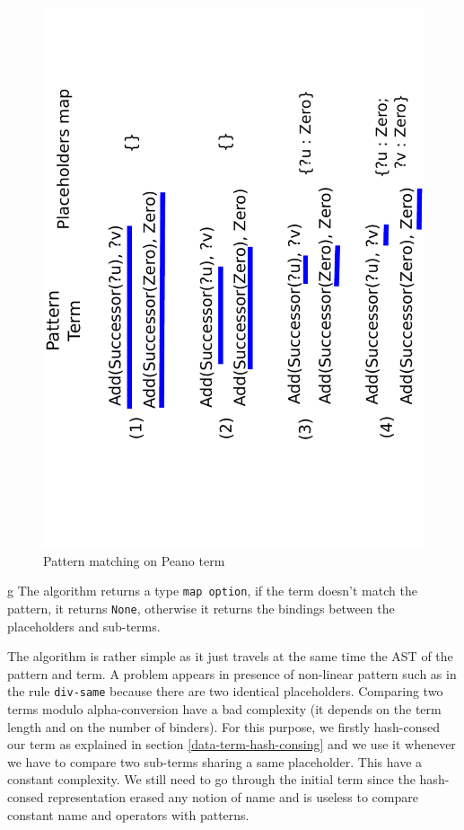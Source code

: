 \documentclass[12pt,a4paper]{article}
\begin{document}
\begin{figure}
  \centering
  \includegraphics[scale=0.6, angle=270]{example-peano.pdf}
  \caption{Pattern matching on Peano term}
  \label{peano-example}
\end{figure}
g
The algorithm returns a type \texttt{map option}, if the term doesn't match the pattern, it returns \texttt{None}, otherwise it returns the bindings between the placeholders and sub-terms.
\newline

The algorithm is rather simple as it just travels at the same time the AST of the pattern and term. A problem appears in presence of non-linear pattern such as in the rule \texttt{div-same} because there are two identical placeholders. Comparing two terms modulo alpha-conversion have a bad complexity (it depends on the term length and on the number of binders). For this purpose, we firstly hash-consed our term as explained in section \ref{data-term-hash-consing} and we use it whenever we have to compare two sub-terms sharing a same placeholder. This have a constant complexity. We still need to go through the initial term since the hash-consed representation erased any notion of name and is useless to compare constant name and operators with patterns.
\end{document}
